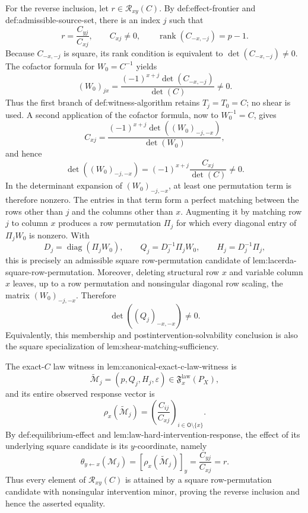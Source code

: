 For the reverse inclusion, let \(r\in\mathcal R_{xy}(C)\).  By
\textnormal{def:effect-frontier} and
\textnormal{def:admissible-source-set}, there is an index \(j\) such that
\[
 r=\frac{C_{yj}}{C_{xj}},\qquad
 C_{xj}\ne0,\qquad
 \operatorname{rank}(C_{-x,-j})=p-1.
\]
Because \(C_{-x,-j}\) is square, its rank condition is equivalent to
\(\det(C_{-x,-j})\ne0\).  The cofactor formula for \(W_0=C^{-1}\) yields
\[
 (W_0)_{jx}
 =\frac{(-1)^{x+j}\det(C_{-x,-j})}{\det(C)}\ne0.
\]
Thus the first branch of \textnormal{def:witness-algorithm} retains
\(T_j=T_0=C\); no shear is used.  A second application of the cofactor formula,
now to \(W_0^{-1}=C\), gives
\[
 C_{xj}
 =\frac{(-1)^{x+j}\det((W_0)_{-j,-x})}{\det(W_0)},
\]
and hence
\[
 \det((W_0)_{-j,-x})
 =(-1)^{x+j}\frac{C_{xj}}{\det(C)}\ne0.
\]
In the determinant expansion of \((W_0)_{-j,-x}\), at least one permutation
term is therefore nonzero.  The entries in that term form a perfect matching
between the rows other than \(j\) and the columns other than \(x\).  Augmenting
it by matching row \(j\) to column \(x\) produces a row permutation
\(\Pi_j\) for which every diagonal entry of \(\Pi_jW_0\) is nonzero.  With
\[
 D_j=\operatorname{diag}(\Pi_jW_0),\qquad
 Q_j=D_j^{-1}\Pi_jW_0,\qquad
 H_j=D_j^{-1}\Pi_j,
\]
this is precisely an admissible square row-permutation candidate of
\textnormal{lem:lacerda-square-row-permutation}.  Moreover, deleting structural
row \(x\) and variable column \(x\) leaves, up to a row permutation and
nonsingular diagonal row scaling, the matrix \((W_0)_{-j,-x}\).  Therefore
\[
 \det((Q_j)_{-x,-x})\ne0.
\]
Equivalently, this membership and postintervention-solvability conclusion is
also the square specialization of
\textnormal{lem:shear-matching-sufficiency}.

The exact-\(C\) law witness in
\textnormal{lem:canonical-exact-c-law-witness} is
\[
 \widetilde{\mathcal M}_j=(p,Q_j,H_j,\varepsilon)
 \in\mathfrak F_x^{\mathrm{law}}(P_X),
\]
and its entire observed response vector is
\[
 \rho_x(\widetilde{\mathcal M}_j)
 =\left(\frac{C_{ij}}{C_{xj}}\right)_{i\in\mathsf O\setminus\{x\}}.
\]
By \textnormal{def:equilibrium-effect} and
\textnormal{lem:law-hard-intervention-response}, the effect of its underlying
square candidate is its \(y\)-coordinate, namely
\[
 \theta_{y\leftarrow x}(\mathcal M_j)
 =[\rho_x(\widetilde{\mathcal M}_j)]_y
 =\frac{C_{yj}}{C_{xj}}=r.
\]
Thus every element of \(\mathcal R_{xy}(C)\) is attained by a square
row-permutation candidate with nonsingular intervention minor, proving the
reverse inclusion and hence the asserted equality.

